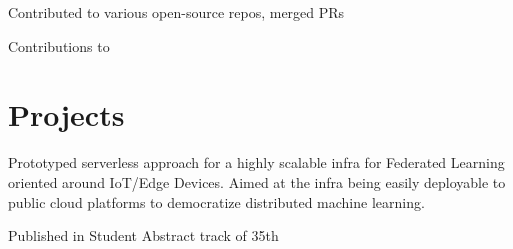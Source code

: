 \documentclass[]{deedy-resume-openfont}
\begin{document}
\begin{minipage}[t]{0.67\textwidth}
\begin{tightemize}
\item Contributed to various open-source repos, merged PRs 
\item Contributions to 


\end{tightemize}


\vspace{}
\section{Projects}
\vspace{}
\begin{tightemize}
\item Prototyped serverless approach for a highly scalable infra for Federated Learning oriented around IoT/Edge Devices. Aimed at the infra being easily deployable to public cloud platforms to democratize distributed machine learning.
\item Published in Student Abstract track of 35th 
\end{tightemize}


\end{minipage}
\end{document}
